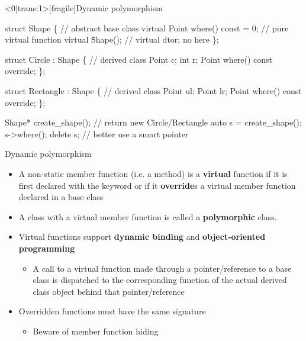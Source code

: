 \begin{frame}<0|trans:1>[fragile]{Dynamic polymorphism \insertcontinuationtext}

  \begin{codeblock}{
struct Shape \{                     // \alert{abstract} base class
  \alert{virtual} Point where() const \alert{= 0}; // \alert{pure virtual} function
  \alert{virtual} \~Shape();                // virtual dtor; no  here
\};

struct Circle : Shape \{ // derived class
  Point c;
  int r;
  Point where() const \alert{override};
\};

struct Rectangle : Shape \{ // derived class
  Point ul;
  Point lr;
  Point where() const \alert{override};
\};

Shape\alert{*} create_shape();   // return \alert{new} Circle/Rectangle
auto s = create_shape();
s->where();
delete s;                // better use a smart pointer
}\end{codeblock}

\end{frame}

\begin{frame}{Dynamic polymorphism \insertcontinuationtext}

  \begin{itemize}
  \item<1-> A non-static member function (i.e. a method) is a \textbf{virtual}
    function if it is first declared with the keyword  or if it
    \textbf{override}s a virtual member function declared in a base class
  \item<1-> A class with a virtual member function is called a
    \textbf{polymorphic} class.
  \item<2-> Virtual functions support \textbf{dynamic binding} and
    \textbf{object-oriented programming}
    \begin{itemize}
    \item A call to a virtual function made through a pointer/reference to a
      base class is dispatched to the corresponding function of the actual
      derived class object behind that pointer/reference
    \end{itemize}
  \item<2-> Overridden functions must have the same signature
    \begin{itemize}
    \item Beware of member function hiding
    \end{itemize}
  \end{itemize}

\end{frame}


